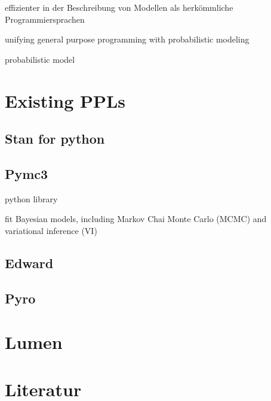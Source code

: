 \documentclass{article}
\begin{document}
effizienter in der Beschreibung von Modellen als herkömmliche Programmiersprachen \cite{Hardesty2015}

unifying general purpose programming with probabilistic modeling \cite{probabilistic-programming.org}


\gls{probabilistic model}

\section{Existing PPLs}

\subsection{Stan for python}

\subsection{Pymc3}

python library

fit Bayesian models, including Markov Chai Monte Carlo (MCMC) and variational inference (VI)


\subsection{Edward}

\subsection{Pyro}


\section{Lumen}
        
\section{Literatur}




\end{document}
